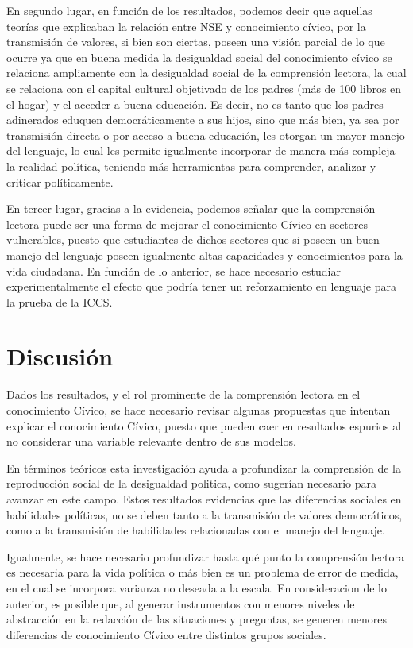 \documentclass[12pt,twoside]{templates/facsothesis}
\begin{document}
En segundo lugar, en función de los resultados, podemos decir que aquellas teorías que explicaban la relación entre NSE y conocimiento cívico, por la transmisión de valores, si bien son ciertas, poseen una visión parcial de lo que ocurre ya que en buena medida la desigualdad social del conocimiento cívico se relaciona ampliamente con la desigualdad social de la comprensión lectora, la cual se relaciona con el capital cultural objetivado de los padres (más de 100 libros en el hogar) y el acceder a buena educación. Es decir, no es tanto que los padres adinerados eduquen democráticamente a sus hijos, sino que más bien, ya sea por transmisión directa o por acceso a buena educación, les otorgan un mayor manejo del lenguaje, lo cual les permite igualmente incorporar de manera más compleja la realidad política, teniendo más herramientas para comprender, analizar y criticar políticamente.

En tercer lugar, gracias a la evidencia, podemos señalar que la comprensión lectora puede ser una forma de mejorar el conocimiento Cívico en sectores vulnerables, puesto que estudiantes de dichos sectores que si poseen un buen manejo del lenguaje poseen igualmente altas capacidades y conocimientos para la vida ciudadana. En función de lo anterior, se hace necesario estudiar experimentalmente el efecto que podría tener un reforzamiento en lenguaje para la prueba de la ICCS.

\hypertarget{discusiuxf3n}{%
\section{Discusión}\label{discusiuxf3n}}

Dados los resultados, y el rol prominente de la comprensión lectora en el conocimiento Cívico, se hace necesario revisar algunas propuestas que intentan explicar el conocimiento Cívico, puesto que pueden caer en resultados espurios al no considerar una variable relevante dentro de sus modelos.

En términos teóricos esta investigación ayuda a profundizar la comprensión de la reproducción social de la desigualdad politica, como \citet{brady_Political_2015} sugerían necesario para avanzar en este campo. Estos resultados evidencias que las diferencias sociales en habilidades políticas, no se deben tanto a la transmisión de valores democráticos, como a la transmisión de habilidades relacionadas con el manejo del lenguaje.

Igualmente, se hace necesario profundizar hasta qué punto la comprensión lectora es necesaria para la vida política o más bien es un problema de error de medida, en el cual se incorpora varianza no deseada a la escala. En consideracion de lo anterior, es posible que, al generar instrumentos con menores niveles de abstracción en la redacción de las situaciones y preguntas, se generen menores diferencias de conocimiento Cívico entre distintos grupos sociales.
\end{document}
